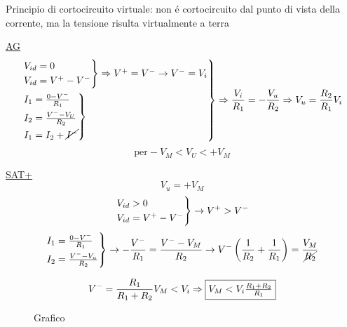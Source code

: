 Principio di cortocircuito virtuale: non \'e cortocircuito dal punto di vista della corrente, ma la tensione risulta virtualmente a terra

\underline{AG}
\[
    \begin{rcases}
    \begin{rcases}
        V_{id} = 0\\
        V_{id} = V^+ - V^-
    \end{rcases}
    \Rightarrow V^+ = V^- \rightarrow V^- = V_i\\
    \begin{rcases}
    I_1 = \frac{0 - V^-}{R_1}\\
    I_2 = \frac{V^- - V_U}{R_2}\\
    I_1 = I_2 + \cancel{I^-}
    \end{rcases}
    \end{rcases}\Rightarrow
        \frac{V_i}{R_1} = -\frac{V_u}{R_2} \Rightarrow
    V_u = \frac{R_2}{R_1} V_i
\]
\[
    \text{per} -V_M < V_U < +V_M
\]

\underline{SAT+}
\[
    V_u = +V_M
\]
\bigbreak
\[
    \begin{rcases}
        V_{id} > 0\\
        V_{id} = V^+ - V^-
    \end{rcases}\rightarrow V^+ > V^-
\]
\bigbreak
\[
    \begin{rcases}
    I_1 = \frac{0 - V^-}{R_1}\\
    I_2 = \frac{V^- - V_u}{R_2}
\end{rcases} \rightarrow -\frac{V^-}{R_1} = \frac{V^- - V_M}{R_2} \rightarrow V^-\left(\frac{1}{R_2} + \frac{1}{R_1}\right) = \frac{V_M}{\cancel{R_2}}
\]

\[
    V^- = \frac{R_1}{R_1 + R_2} V_M < V_i
    \Rightarrow \framebox{$V_M < V_i \frac{R_1 + R_2}{R_1}$}
\]
\begin{figure}[H]
    \centering

    \caption{Grafico}
\end{figure}

